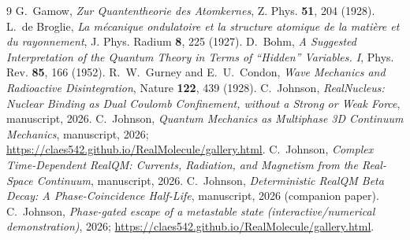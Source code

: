 \documentclass[11pt]{article}
\begin{document}
\begin{thebibliography}{9}
 G.~Gamow, \emph{Zur Quantentheorie des Atomkernes}, Z. Phys. \textbf{51}, 204 (1928).
 L.~de Broglie, \emph{La m\'ecanique ondulatoire et la structure atomique de la
mati\`ere et du rayonnement}, J. Phys. Radium \textbf{8}, 225 (1927).
 D.~Bohm, \emph{A Suggested Interpretation of the Quantum Theory in Terms of ``Hidden''
Variables. I}, Phys. Rev. \textbf{85}, 166 (1952).
 R.~W.~Gurney and E.~U.~Condon, \emph{Wave Mechanics and Radioactive Disintegration},
Nature \textbf{122}, 439 (1928).
 C.~Johnson, \emph{RealNucleus: Nuclear Binding as Dual Coulomb Confinement, without a
Strong or Weak Force}, manuscript, 2026.
 C.~Johnson, \emph{Quantum Mechanics as Multiphase 3D Continuum Mechanics}, manuscript,
2026; \url{https://claes542.github.io/RealMolecule/gallery.html}.
 C.~Johnson, \emph{Complex Time-Dependent RealQM: Currents, Radiation, and Magnetism
from the Real-Space Continuum}, manuscript, 2026.
 C.~Johnson, \emph{Deterministic RealQM Beta Decay: A Phase-Coincidence Half-Life},
manuscript, 2026 (companion paper).
 C.~Johnson, \emph{Phase-gated escape of a metastable state (interactive/numerical
demonstration)}, 2026; \url{https://claes542.github.io/RealMolecule/gallery.html}.
\end{thebibliography}
\end{document}

